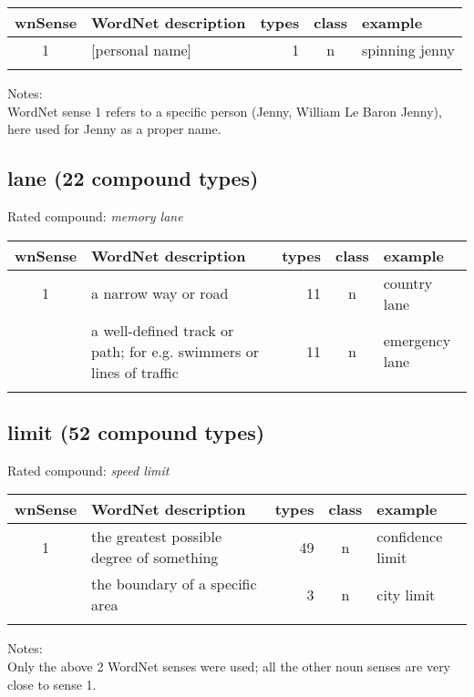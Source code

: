\noindent
\begin{longtable}{c>{\raggedright\arraybackslash}p{5cm}rc>{\raggedright\arraybackslash}p{2cm}}\lsptoprule
{\small wnSense}&WordNet description&types&class&example\\\midrule
1&{}[personal name]&1&n&spinning jenny\\\lspbottomrule
\end{longtable}

\noindent
Notes:\\
WordNet sense 1 refers to a specific person (Jenny, William Le Baron
Jenny), here used for Jenny as a proper name.
\subsection{lane      (22 compound types)}
Rated compound: \emph{memory lane}

\vspace*{1ex}

\noindent
\begin{longtable}{c>{\raggedright\arraybackslash}p{5cm}rc>{\raggedright\arraybackslash}p{2cm}}\lsptoprule
{\small wnSense}&WordNet description&types&class&example\\\midrule
1&a narrow way or road&11&n&country lane\\\tablevspace
2&a well-defined track or path; for e.g. swimmers or lines of traffic&11&n&emergency lane\\\lspbottomrule
\end{longtable}
\subsection{limit    (52 compound types)}
Rated compound: \emph{speed limit}

\vspace*{1ex}

\noindent
\begin{longtable}{c>{\raggedright\arraybackslash}p{5cm}rc>{\raggedright\arraybackslash}p{2cm}}\lsptoprule
{\small wnSense}&WordNet description&types&class&example\\\midrule
1&the greatest possible degree of something&49&n&confidence limit\\\tablevspace
4&the boundary of a specific area&3&n&city limit\\\lspbottomrule
\end{longtable}

\noindent
Notes:\\
Only the above 2 WordNet senses were used; all the other noun senses are very close to sense 1.

